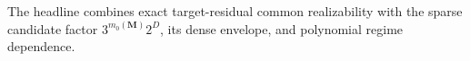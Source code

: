 The headline combines exact target-residual common realizability with the sparse candidate factor \(3^{m_0(\mathbf M)}2^D\), its dense envelope, and polynomial regime dependence.